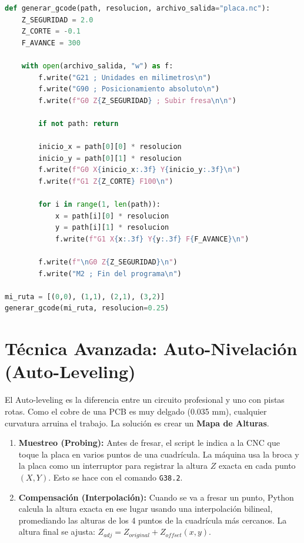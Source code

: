 \documentclass[12pt, a4paper]{article}
\begin{document}
\begin{lstlisting}[language=Python, caption=Generador de G-Code a partir de una ruta]
def generar_gcode(path, resolucion, archivo_salida="placa.nc"):
    Z_SEGURIDAD = 2.0
    Z_CORTE = -0.1
    F_AVANCE = 300

    with open(archivo_salida, "w") as f:
        f.write("G21 ; Unidades en milimetros\n")
        f.write("G90 ; Posicionamiento absoluto\n")
        f.write(f"G0 Z{Z_SEGURIDAD} ; Subir fresa\n\n")

        if not path: return

        inicio_x = path[0][0] * resolucion
        inicio_y = path[0][1] * resolucion
        f.write(f"G0 X{inicio_x:.3f} Y{inicio_y:.3f}\n")
        f.write(f"G1 Z{Z_CORTE} F100\n")

        for i in range(1, len(path)):
            x = path[i][0] * resolucion
            y = path[i][1] * resolucion
            f.write(f"G1 X{x:.3f} Y{y:.3f} F{F_AVANCE}\n")

        f.write(f"\nG0 Z{Z_SEGURIDAD}\n")
        f.write("M2 ; Fin del programa\n")

mi_ruta = [(0,0), (1,1), (2,1), (3,2)]
generar_gcode(mi_ruta, resolucion=0.25)
\end{lstlisting}

\section{Técnica Avanzada: Auto-Nivelación (Auto-Leveling)}

El Auto-leveling es la diferencia entre un circuito profesional y uno con pistas rotas. Como el cobre de una PCB es muy delgado (0.035 mm), cualquier curvatura arruina el trabajo. La solución es crear un \textbf{Mapa de Alturas}.

\begin{enumerate}
    \item \textbf{Muestreo (Probing):} Antes de fresar, el script le indica a la CNC que toque la placa en varios puntos de una cuadrícula. La máquina usa la broca y la placa como un interruptor para registrar la altura $Z$ exacta en cada punto $(X, Y)$. Esto se hace con el comando \texttt{G38.2}.
    \item \textbf{Compensación (Interpolación):} Cuando se va a fresar un punto, Python calcula la altura exacta en ese lugar usando una interpolación bilineal, promediando las alturas de los 4 puntos de la cuadrícula más cercanos. La altura final se ajusta: $Z_{adj} = Z_{original} + Z_{offset}(x, y)$.
\end{enumerate}
\end{document}
